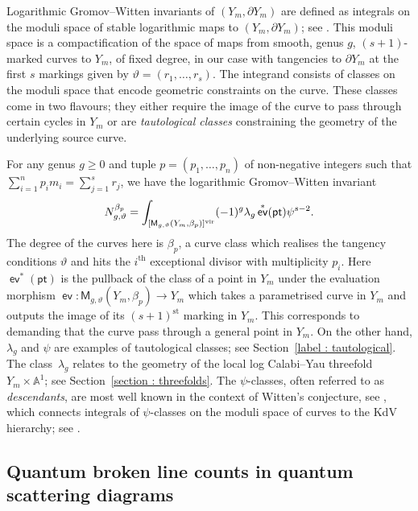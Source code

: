 \documentclass[11pt]{amsart}
\numberwithin{equation}{section}
\theoremstyle{plain}
\theoremstyle{remark}
\theoremstyle{definition}
\DeclareMathOperator{\ev}{\mathsf{ev}}
\newcommand{\AAA}{\mathbb{A}}
\newcommand{\vir}{\text{\rm vir}}
\newcommand{\pt}{{\mathsf{pt}}}
\newcommand{\supth}[1]{\ensuremath{#1^{\mathrm{th}}}}
\newcommand{\supst}[1]{\ensuremath{#1^{\mathrm{st}}}}
\begin{document}
Logarithmic Gromov--Witten invariants of $(Y_m,\partial Y_m)$ are defined as integrals on the moduli space of stable logarithmic maps to $(Y_m,\partial Y_m)$; see \cite{chen2011stable,abramovich2011stable,gross2012logarithmic}. This moduli space is a compactification of the space of maps from smooth, genus $g$, $(s+1)$-marked curves to $Y_m$, of fixed degree, in our case with tangencies to $\partial Y_m$ at the first $s$ markings given by $\vartheta = (r_1,\dots,r_s)$. The integrand consists of classes on the moduli space that encode geometric constraints on the curve. These classes come in two flavours; they either require the image of the curve to pass through certain cycles in $Y_m$ or are \emph{tautological classes} constraining the geometry of the underlying source curve. 

For any genus $g \geq 0$ and tuple $p = (p_1,\dots,p_n)$ of non-negative integers such that $\sum_{i=1}^{n} p_i m_i = \sum_{j=1}^s r_j$, we have the logarithmic Gromov--Witten invariant $$N_{g,\vartheta}^{\beta_p} = \int_{[\mathsf{M}_{g,\vartheta}(Y_m,\beta_p)]^{\vir}}(-1)^g\lambda_g \ev^* (\mathsf{pt}) \psi^{s-2}.$$
The degree of the curves here is $\beta_p$, a curve class which realises the tangency conditions $\vartheta$ and hits the $\supth{i}$ exceptional divisor with multiplicity $p_i$. Here $\ev^* (\pt)$ is the pullback of the class of a point in $Y_m$ under the evaluation morphism $\ev \colon \mathsf{M}_{g,\vartheta}(Y_m,\beta_p) \rightarrow Y_m$ which takes a parametrised curve in $Y_m$ and outputs the image of its $\supst{(s+1)}$ marking in $Y_m$. This corresponds to demanding that the curve pass through a general point in $Y_m$. On the other hand, $\lambda_g$ and $\psi$ are examples of tautological classes; see Section~\ref{label : tautological}. The class~$\lambda_g$ relates to the geometry of the local log Calabi--Yau threefold $Y_m \times \AAA^1$; 
see Section~\ref{section : threefolds}. The $\psi$-classes, often referred to as \emph{descendants}, are most well known in the context of Witten's conjecture, see \cite{witten1991gravity}, which connects integrals of $\psi$-classes on the moduli space of curves to the KdV hierarchy; see \cite{kontsevich1992intersection}.

\subsection{Quantum broken line counts in quantum scattering diagrams}
\end{document}
